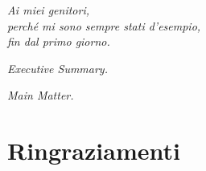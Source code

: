 \documentclass{Configuration_Files/PoliMi3i_thesis}
\begin{document}
\newpage
\thispagestyle{empty}
\begin{minipage}{\textwidth}
    \vspace{2cm}
    \begin{flushright}
    \textit{Ai miei genitori,\\[2ex]perché mi sono sempre stati d'esempio,\\[2ex]fin dal primo giorno.}
    \end{flushright}
\end{minipage}
\newpage
\blankpage


\thispagestyle{empty}
\begin{minipage}{\textwidth}
    \vspace{3cm}
    \begin{center}
    \textit{\large Executive Summary.}
    \end{center}
\end{minipage}
\newpage
\blankpage


\thispagestyle{empty}
\begin{minipage}{\textwidth}
    \vspace{3cm}
    \begin{center}
    \textit{\large Main Matter.}
    \end{center}
\end{minipage}
\cleardoublepage



\startpreamble
\setcounter{page}{1} %
\thispagestyle{empty}
\tableofcontents %
\thispagestyle{empty}
\cleardoublepage

\thispagestyle{empty}
\listoffigures
\cleardoublepage

\listoftables

\cleardoublepage




\chapter*{Ringraziamenti}

\end{document}
